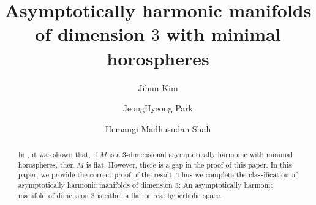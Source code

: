 \documentclass[12pt,a4paper]{amsart}
\theoremstyle{definition}
\theoremstyle{remark}
\newcommand \<{\langle}
\renewcommand \>{\rangle}
\begin{document}
\title[]
{}


\title
[Asymptotically harmonic manifolds of dimension $3$]
{Asymptotically harmonic manifolds of dimension \boldmath$3$\unboldmath \; with minimal horospheres}



\author{Jihun Kim\and JeongHyeong Park\and Hemangi  Madhusudan Shah}
\address{Department of Mathematics, Sungkyunkwan University, Suwon, 16419, Korea}
\address{Harish Chandra Research Institute,  A CI of Homi Bhabha National Institute,
 Chhatnag Road, Jhusi, Allahabad 211019, India}



 \begin{abstract}
In \cite{S2}, it was shown that,  if $M$ is a $3$-dimensional asymptotically harmonic with minimal horospheres, then $M$ is flat.  However, there is a gap in the proof of this paper.  In this paper, we provide the correct proof of the result.
Thus we complete the classification
of asymptotically harmonic manifolds of dimension $3$:
An asymptotically harmonic manifold of dimension $3$ is either a flat or real hyperbolic space.
\end{abstract}
\end{document}
